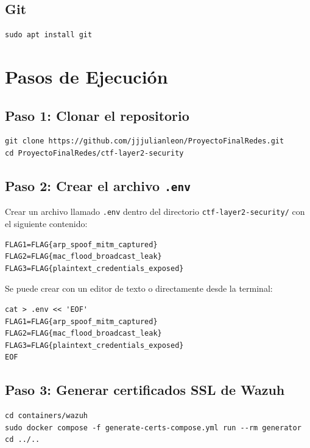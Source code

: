 \documentclass[12pt,a4paper]{article}
\begin{document}
\subsection{Git}

\begin{lstlisting}
sudo apt install git
\end{lstlisting}

\section{Pasos de Ejecuci\'on}

\subsection{Paso 1: Clonar el repositorio}

\begin{lstlisting}
git clone https://github.com/jjjulianleon/ProyectoFinalRedes.git
cd ProyectoFinalRedes/ctf-layer2-security
\end{lstlisting}

\subsection{Paso 2: Crear el archivo \texttt{.env}}

Crear un archivo llamado \texttt{.env} dentro del directorio \texttt{ctf-layer2-security/} con el siguiente contenido:

\begin{lstlisting}[style=envstyle]
FLAG1=FLAG{arp_spoof_mitm_captured}
FLAG2=FLAG{mac_flood_broadcast_leak}
FLAG3=FLAG{plaintext_credentials_exposed}
\end{lstlisting}

Se puede crear con un editor de texto o directamente desde la terminal:

\begin{lstlisting}
cat > .env << 'EOF'
FLAG1=FLAG{arp_spoof_mitm_captured}
FLAG2=FLAG{mac_flood_broadcast_leak}
FLAG3=FLAG{plaintext_credentials_exposed}
EOF
\end{lstlisting}

\subsection{Paso 3: Generar certificados SSL de Wazuh}

\begin{lstlisting}
cd containers/wazuh
sudo docker compose -f generate-certs-compose.yml run --rm generator
cd ../..
\end{lstlisting}
\end{document}
